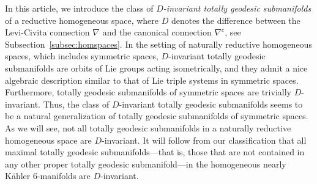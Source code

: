 \documentclass[11pt,a4paper,final]{amsart}
\theoremstyle{definition}
\begin{document}
In this article, we introduce the class of \textit{$D$-invariant totally geodesic submanifolds} of a reductive homogeneous space, where $D$ denotes the difference between the Levi-Civita connection $\nabla$ and the canonical connection $\nabla^c$, see Subsection~\ref{subsec:homspaces}.
In the setting of naturally reductive homogeneous spaces, which includes symmetric spaces,   $D$-invariant totally geodesic submanifolds are orbits of Lie groups acting isometrically, and they admit a nice algebraic description similar to that of Lie triple systems in symmetric spaces.
Furthermore, totally geodesic submanifolds of symmetric spaces are trivially $D$-invariant.
Thus, the class of $D$-invariant totally geodesic submanifolds seems to be a natural generalization of totally geodesic submanifolds of symmetric spaces.
As we will see, not all totally geodesic submanifolds in a naturally reductive homogeneous space are $D$-invariant.
It will follow from our classification that all maximal totally geodesic submanifolds---that is, those that are not contained in any other proper totally geodesic submanifold---in the homogeneous nearly Kähler $6$-manifolds are $D$-invariant. 
\end{document}
